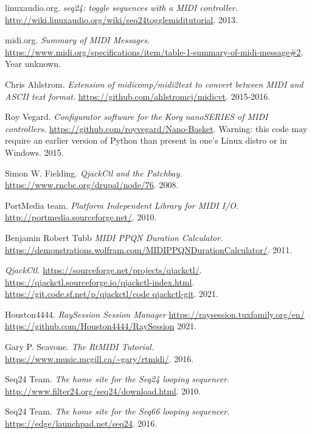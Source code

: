 {\begin{thebibliography}{99}
   linuxaudio.org.
   \emph{seq24: toggle sequences with a MIDI controller.}
   \url{http://wiki.linuxaudio.org/wiki/seq24togglemiditutorial}.
   2013.

   midi.org.
   \emph{Summary of MIDI Messages.}
   \url{https://www.midi.org/specifications/item/table-1-summary-of-midi-message#2}.
   Year unknown.

   Chris Ahlstrom.
   \emph{Extension of midicomp/midi2text to convert between MIDI and ASCII
      text format.}
   \url{https://github.com/ahlstromcj/midicvt}.
   2015-2016.

   Roy Vegard.
   \emph{Configurator software for the Korg nanoSERIES of MIDI controllers.}
   \url{https://github.com/royvegard/Nano-Basket}.
   Warning: this code may require an earlier version of Python than present in
   one's Linux distro or in Windows.
   2015.

   Simon W. Fielding.
   \emph{QjackCtl and the Patchbay.}
   \url{https://www.rncbc.org/drupal/node/76}.
   2008.

   PortMedia team.
   \emph{Platform Independent Library for MIDI I/O.}
   \url{http://portmedia.sourceforge.net/}.
   2010.

   Benjamin Robert Tubb
   \emph{MIDI PPQN Duration Calculator.}
   \url{https://demonstrations.wolfram.com/MIDIPPQNDurationCalculator/}.
   2011.

   \emph{QjackCtl.}
   \url{https://sourceforge.net/projects/qjackctl/}.
   \url{https://qjackctl.sourceforge.io/qjackctl-index.html}.
   \url{https://git.code.sf.net/p/qjackctl/code qjackctl-git}.
   2021.

   Houston4444.
   \emph{RaySession Session Manager}
   \url{https://raysession.tuxfamily.org/en/}
   \url{https://github.com/Houston4444/RaySession}
   2021.

   Gary P. Scavone.
   \emph{The RtMIDI Tutorial.}
   \url{https://www.music.mcgill.ca/~gary/rtmidi/}.
   2016.

   Seq24 Team.
   \emph{The home site for the Seq24 looping sequencer.}
   \url{http://www.filter24.org/seq24/download.html}.
   2010.

   Seq24 Team.
   \emph{The home site for the Seq66 looping sequencer.}
   \url{https://edge/launchpad.net/seq24}.
   2016.


\end{thebibliography}}
